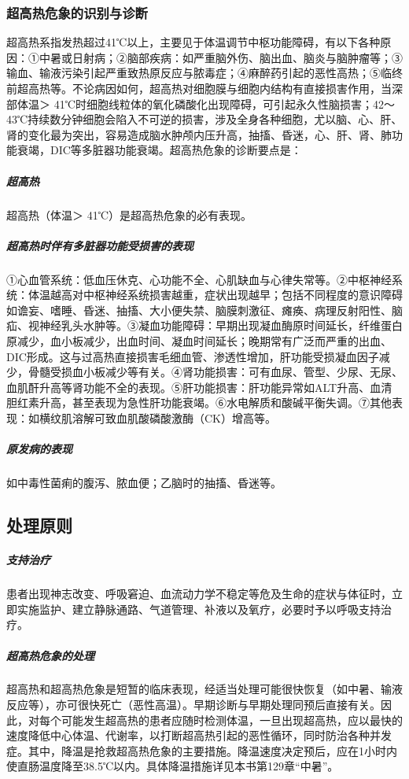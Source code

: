 \subsubsection{超高热危象的识别与诊断}

超高热系指发热超过41℃以上，主要见于体温调节中枢功能障碍，有以下各种原因：①中暑或日射病；②脑部疾病：如严重脑外伤、脑出血、脑炎与脑肿瘤等；③输血、输液污染引起严重致热原反应与脓毒症；④麻醉药引起的恶性高热；⑤临终前超高热等。不论病因如何，超高热对细胞膜与细胞内结构有直接损害作用，当深部体温＞
41℃时细胞线粒体的氧化磷酸化出现障碍，可引起永久性脑损害；42～43℃持续数分钟细胞会陷入不可逆的损害，涉及全身各种细胞，尤以脑、心、肝、肾的变化最为突出，容易造成脑水肿颅内压升高，抽搐、昏迷，心、肝、肾、肺功能衰竭，DIC等多脏器功能衰竭。超高热危象的诊断要点是：

\subparagraph{超高热}

超高热（体温＞ 41℃）是超高热危象的必有表现。

\subparagraph{超高热时伴有多脏器功能受损害的表现}

①心血管系统：低血压休克、心功能不全、心肌缺血与心律失常等。②中枢神经系统：体温越高对中枢神经系统损害越重，症状出现越早；包括不同程度的意识障碍如谵妄、嗜睡、昏迷、抽搐、大小便失禁、脑膜刺激征、瘫痪、病理反射阳性、脑疝、视神经乳头水肿等。③凝血功能障碍：早期出现凝血酶原时间延长，纤维蛋白原减少，血小板减少，出血时间、凝血时间延长；晚期常有广泛而严重的出血、DIC形成。这与过高热直接损害毛细血管、渗透性增加，肝功能受损凝血因子减少，骨髓受损血小板减少等有关。④肾功能损害：可有血尿、管型、少尿、无尿、血肌酐升高等肾功能不全的表现。⑤肝功能损害：肝功能异常如ALT升高、血清胆红素升高，甚至表现为急性肝功能衰竭。⑥水电解质和酸碱平衡失调。⑦其他表现：如横纹肌溶解可致血肌酸磷酸激酶（CK）增高等。

\subparagraph{原发病的表现}

如中毒性菌痢的腹泻、脓血便；乙脑时的抽搐、昏迷等。

\subsection{处理原则}

\subparagraph{支持治疗}

患者出现神志改变、呼吸窘迫、血流动力学不稳定等危及生命的症状与体征时，立即实施监护、建立静脉通路、气道管理、补液以及氧疗，必要时予以呼吸支持治疗。

\subparagraph{超高热危象的处理}

超高热和超高热危象是短暂的临床表现，经适当处理可能很快恢复（如中暑、输液反应等），亦可很快死亡（恶性高温）。早期诊断与早期处理同预后直接有关。因此，对每个可能发生超高热的患者应随时检测体温，一旦出现超高热，应以最快的速度降低中心体温、代谢率，以打断超高热引起的恶性循环，同时防治各种并发症。其中，降温是抢救超高热危象的主要措施。降温速度决定预后，应在1小时内使直肠温度降至38.5℃以内。具体降温措施详见本书第129章“中暑”。

